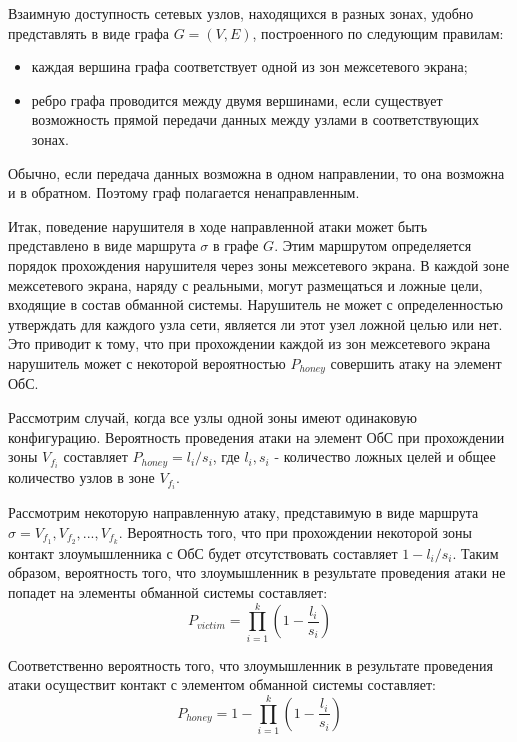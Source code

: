 Взаимную доступность сетевых узлов, находящихся в разных зонах, удобно представлять в виде графа $G = (V, E)$, построенного по следующим правилам:

\begin{itemize}
	\item каждая вершина графа соответствует одной из зон межсетевого экрана;
	\item ребро графа проводится между двумя вершинами, если существует возможность прямой передачи данных между узлами в соответствующих зонах.
\end{itemize}

Обычно, если передача данных возможна в одном направлении, то она возможна и в обратном. Поэтому граф полагается ненаправленным.

Итак, поведение нарушителя в ходе направленной атаки может быть представлено в виде маршрута $\sigma$ в графе $G$. Этим маршрутом определяется порядок прохождения нарушителя через зоны межсетевого экрана. В каждой зоне межсетевого экрана, наряду с реальными, могут размещаться и ложные цели, входящие в состав обманной системы. Нарушитель не может с определенностью утверждать для каждого узла сети, является ли этот узел ложной целью или нет. Это приводит к тому, что при прохождении каждой из зон межсетевого экрана нарушитель может с некоторой вероятностью $P_{honey}$ совершить атаку на элемент ОбС.

Рассмотрим случай, когда все узлы одной зоны имеют одинаковую конфигурацию. Вероятность проведения атаки на элемент ОбС при прохождении зоны $V_{f_i}$ составляет $P_{honey} = l_i / s_i$, где $l_i, s_i$ - количество ложных целей и общее количество узлов в зоне $V_{f_i}$.

Рассмотрим некоторую направленную атаку, представимую в виде маршрута $\sigma = V_{f_1}, V_{f_2}, ... , V_{f_k}$. Вероятность того, что при прохождении некоторой зоны  контакт злоумышленника с ОбС будет отсутствовать составляет $ 1 - l_i / s_i$. Таким образом, вероятность того, что злоумышленник в результате проведения атаки  не попадет на элементы обманной системы составляет:
\begin{equation}
P_{victim} = \prod_{i=1}^k (1 - \frac{l_i}{s_i})
\end{equation}

Соответственно вероятность того, что злоумышленник в результате проведения атаки осуществит контакт с элементом обманной системы составляет:
\begin{equation}
\label{eq:p_honey}
P_{honey} = 1 - \prod_{i=1}^k (1 - \frac{l_i}{s_i})
\end{equation}

